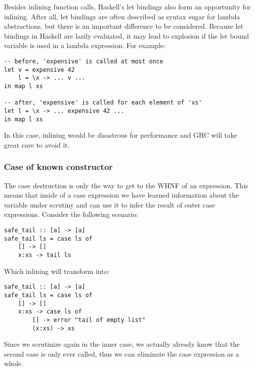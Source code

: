 Besides inlining function calls, Haskell's let bindings also form an opportunity for inlining.
After all, let bindings are often described as syntax sugar for lambda abstractions, but there is an important difference to be considered.
Because let bindings in Haskell are lazily evaluated, it may lead to explosion if the let bound variable is used in a lambda
expression. For example:

\begin{listing}[H]
\begin{verbatim}
-- before, 'expensive' is called at most once
let v = expensive 42
    l = \x -> ... v ...
in map l xs

-- after, 'expensive' is called for each element of 'xs'
let l = \x -> ... expensive 42 ...
in map l xs
\end{verbatim}
\end{listing}

In this case, inlining would be disastrous for performance and GHC will take great care to avoid it. 

\subsubsection{Case of known constructor}

The case destruction is only the way to get to the WHNF of an expression. This means that inside of a case expression
we have learned information about the variable under scrutiny and can use it to infer the result of outer case expressions.
Consider the following scenario:

\begin{listing}[H]
\begin{verbatim}
safe_tail :: [a] -> [a]
safe_tail ls = case ls of
    [] -> []
    x:xs -> tail ls
\end{verbatim}
\end{listing}

Which inlining will transform into:

\begin{listing}[H]
\begin{verbatim}
safe_tail :: [a] -> [a]
safe_tail ls = case ls of
    [] -> []
    x:xs -> case ls of
        [] -> error "tail of empty list"
        (x:xs) -> xs
\end{verbatim}
\end{listing}

Since we scrutinize  again in the inner case, we actually already know that the second case is only ever called,
thus we can eliminate the case expression as a whole.

